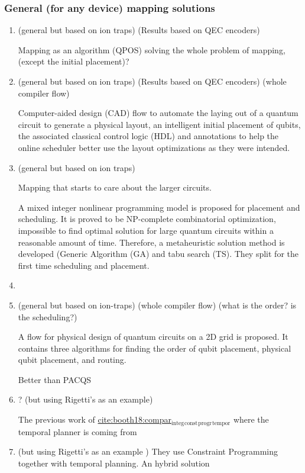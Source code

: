 \documentclass[11pt]{article}
\begin{document}
\subsubsection{General (for any device) mapping solutions}
\label{sec:org95bb41c}

\begin{enumerate}
\item \cite{Metodi_2006} (general but based on ion traps) (Results based on QEC encoders)
\label{sec:org35e192c}

Mapping as an algorithm (QPOS) solving the whole problem of mapping, (except the initial placement)?

\item \cite{Whitney_2007} (general but based on ion traps) (Results based on QEC encoders) (whole compiler flow)
\label{sec:org8047a3b}

Computer-aided design (CAD) flow to automate the laying out of a quantum circuit to generate a physical layout, an intelligent initial placement of qubits, the associated classical control logic (HDL) and annotations to help the online scheduler better use the layout optimizations as they were intended.

\item \cite{Bahreini_2015} (general but based on ion traps)
\label{sec:org3ed929d}

Mapping that starts to care about the larger circuits.

A mixed integer nonlinear programming model is proposed for placement and scheduling.
It is proved to be NP-complete combinatorial optimization, impossible to find optimal solution for large quantum circuits within a reasonable amount of time.
Therefore, a metaheuristic solution method is developed (Generic Algorithm (GA) and tabu search (TS).
They split for the first time scheduling and placement.



\item 
\label{sec:org4c06e26}
\item \cite{Farghadan_2017} (general but based on ion-traps) (whole compiler flow) (what is the order? is the scheduling?)
\label{sec:org458c716}

A flow for physical design of quantum circuits on a 2D grid is proposed.
It contains three algorithms for finding the order of qubit placement, physical qubit placement, and routing.

Better than PACQS \cite{Lin_2015}

\item ? \cite{Venturelli_2018} (but using Rigetti's as an example)
\label{sec:orgdcd1069}

The previous work of \hyperref[sec:orgc223158]{cite:booth18:compar\(_{\text{integ}}\)\(_{\text{const}}\)\(_{\text{progr}}\)\(_{\text{tempor}}\)} where the temporal planner is coming from

\item \cite{booth18:compar_integ_const_progr_tempor} (but using Rigetti's as an example )
\label{sec:orgc223158}
They use Constraint Programming together with temporal planning. An hybrid solution
\end{enumerate}
\end{document}
